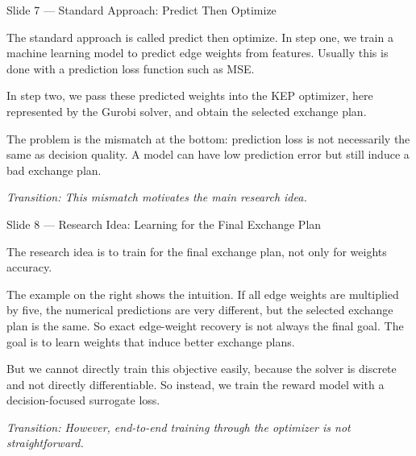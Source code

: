 \documentclass[11pt, aspectratio=169]{beamer}
\newcommand{\tr}[1]{\vspace{0.35em}\textit{\textcolor{black!55}{Transition: #1}}}
\newcommand{\timing}[1]{}
\begin{document}
\begin{frame}{Slide 7 \enspace\textmd{\small\textcolor{black!40}{--- Standard Approach: Predict Then Optimize}}}
\small
\timing{45 seconds}

The standard approach is called predict then optimize. In step one, we train a
machine learning model to predict edge weights from features. Usually this is
done with a prediction loss function such as MSE.

\vspace{0.35em}
In step two, we pass these predicted weights into the KEP optimizer, here
represented by the Gurobi solver, and obtain the selected exchange plan.

\vspace{0.35em}
The problem is the mismatch at the bottom: prediction loss is not necessarily the same as
decision quality. A model can have low prediction error but still induce a bad
exchange plan.

\tr{This mismatch motivates the main research idea.}
\end{frame}

\begin{frame}{Slide 8 \enspace\textmd{\small\textcolor{black!40}{--- Research Idea: Learning for the Final Exchange Plan}}}
\footnotesize
\timing{50 seconds}

The research idea is to train for the final exchange plan, not only for
weights accuracy.

\vspace{0.35em}
The example on the right shows the intuition. If all edge weights are multiplied
by five, the numerical predictions are very different, but the selected exchange
plan is the same. So exact edge-weight recovery is not always the final goal. The
goal is to learn weights that induce better exchange plans.

\vspace{0.35em}
But we cannot directly train this objective easily, because the solver is
discrete and not directly differentiable. So instead, we train the reward model
with a decision-focused surrogate loss.

\tr{However, end-to-end training through the optimizer is not straightforward.}
\end{frame}
\end{document}
